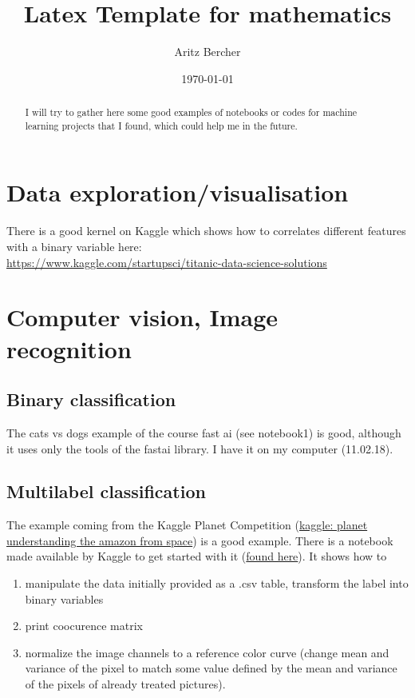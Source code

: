 \documentclass[11pt,a4paper]{article} %
\title{Latex Template for mathematics}
\author{Aritz Bercher}
\date{\today}
\begin{document}
\maketitle

\begin{abstract}
I will try to gather here some good examples of notebooks or codes for machine learning projects that I found, which could help me in the future.
\end{abstract}

\section{Data exploration/visualisation}
There is a good kernel on Kaggle which shows how to correlates different features with a binary variable here:\\
\url{https://www.kaggle.com/startupsci/titanic-data-science-solutions}

\section{Computer vision, Image recognition}

\subsection{Binary classification}
The cats vs dogs example of the course fast ai (see notebook1) is good, although it uses only the tools of the fastai library. I have it on my computer (11.02.18).

\subsection{Multilabel classification}
The example coming from the Kaggle Planet Competition (\href{https://www.kaggle.com/c/planet-understanding-the-amazon-from-space}{kaggle: planet understanding the amazon from space}) is a good example. There is a notebook made available by Kaggle to get started with it (\href{https://www.kaggle.com/robinkraft/getting-started-with-the-data-now-with-docs}{found here}). It shows how to
\begin{enumerate}
\item manipulate the data initially provided as a .csv table, transform the label into binary variables
\item print coocurence matrix
\item normalize the image channels to a reference color curve (change mean and variance of the pixel to match some value defined by the mean and variance of the pixels of already treated pictures).
\end{enumerate}
\end{document}
